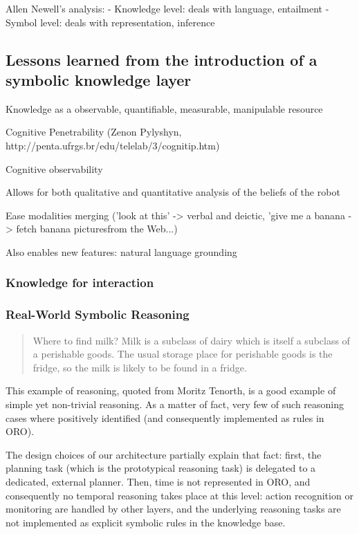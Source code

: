 Allen Newell's analysis:
- Knowledge level: deals with language, entailment
- Symbol level: deals with representation, inference


\subsection{Lessons learned from the introduction of a symbolic knowledge layer}

Knowledge as a observable, quantifiable, measurable, manipulable resource

Cognitive Penetrability (Zenon Pylyshyn, http://penta.ufrgs.br/edu/telelab/3/cognitip.htm)

Cognitive observability

Allows for both qualitative and quantitative analysis of the beliefs of the robot

Ease modalities merging ('look at this' -> verbal and deictic, 'give me a
banana -> fetch banana picturesfrom the Web...)

Also enables new features: natural language grounding


\subsubsection{Knowledge for interaction}

\subsubsection{Real-World Symbolic Reasoning}

\begin{quote}

    Where to find milk? Milk is a subclass of dairy which is itself a subclass
    of a perishable goods. The usual storage place for perishable goods is the
    fridge, so the milk is likely to be found in a fridge.

\end{quote}

This example of reasoning, quoted from Moritz Tenorth, is a good example of
simple yet non-trivial reasoning. As a matter of fact, very few of such
reasoning cases where positively identified (and consequently implemented as
rules in ORO).

The design choices of our architecture partially explain that fact: first, the
planning task (which is the prototypical reasoning task) is delegated to a
dedicated, external planner. Then, time is not represented in ORO, and
consequently no temporal reasoning takes place at this level: action
recognition or monitoring are handled by other layers, and the underlying
reasoning tasks are not implemented as explicit symbolic rules in the knowledge
base.

